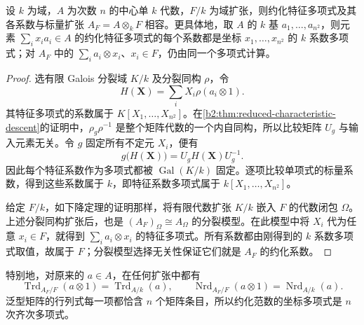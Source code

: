 \begin{proposition}\label{b2:prop:reduced-base-change}
	设 \(k\) 为域，\(A\) 为次数 \(n\) 的中心单 \(k\) 代数，\(F/k\) 为域扩张，则约化特征多项式及其各系数与标量扩张 \(A_F=A\otimes_kF\) 相容。更具体地，取 \(A\) 的 \(k\) 基 \(a_1,\ldots,a_{n^2}\)，则元素 \(\sum_i x_i a_i\in A\) 的约化特征多项式的每个系数都是坐标 \(x_1,\ldots,x_{n^2}\) 的 \(k\) 系数多项式；对 \(A_F\) 中的 \(\sum_i a_i\otimes x_i\)、\(x_i\in F\)，仍由同一个多项式计算。
\end{proposition}
\begin{proof}
	选有限 Galois 分裂域 \(K/k\) 及分裂同构 \(\rho\)，令
	\[
		H(\mathbf X)=\sum_i X_i\rho(a_i\otimes1).
	\]
	其特征多项式的系数属于 \(K[X_1,\ldots,X_{n^2}]\)。在\cref{b2:thm:reduced-characteristic-descent}的证明中，\(\rho_g\rho^{-1}\) 是整个矩阵代数的一个内自同构，所以比较矩阵 \(U_g\) 与输入元素无关。令 \(g\) 固定所有不定元 \(X_i\)，便有
	\[
		g\bigl(H(\mathbf X)\bigr)=U_gH(\mathbf X)U_g^{-1}.
	\]
	因此每个特征系数作为多项式都被 \(\operatorname{Gal}(K/k)\) 固定。逐项比较单项式的标量系数，得到这些系数属于 \(k\)，即特征系数多项式属于 \(k[X_1,\ldots,X_{n^2}]\)。

	给定 \(F/k\)，如下降定理的证明那样，将有限代数扩张 \(K/k\) 嵌入 \(F\) 的代数闭包 \(\Omega\)。上述分裂同构扩张后，也是 \((A_F)_\Omega\cong A_\Omega\) 的分裂模型。在此模型中将 \(X_i\) 代为任意 \(x_i\in F\)，就得到 \(\sum_i a_i\otimes x_i\) 的特征多项式。所有系数都由刚得到的 \(k\) 系数多项式取值，故属于 \(F\)；分裂模型选择无关性保证它们就是 \(A_F\) 的约化系数。
\end{proof}

特别地，对原来的 \(a\in A\)，在任何扩张中都有
\[
	\operatorname{Trd}_{A_F/F}(a\otimes1)=\operatorname{Trd}_{A/k}(a),\qquad \operatorname{Nrd}_{A_F/F}(a\otimes1)=\operatorname{Nrd}_{A/k}(a).
\]
泛型矩阵的行列式每一项都恰含 \(n\) 个矩阵条目，所以约化范数的坐标多项式是 \(n\) 次齐次多项式。

